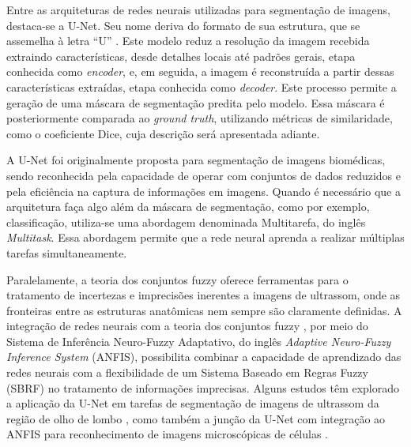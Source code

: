 Entre as arquiteturas de redes neurais utilizadas para segmentação de imagens, destaca-se a U-Net. Seu nome deriva do formato de sua estrutura, que se assemelha à letra “U” \cite{Ronneberger2015UNet}. Este modelo reduz a resolução da imagem recebida extraindo características, desde detalhes locais até padrões gerais, etapa conhecida como \textit{encoder}, e, em seguida, a imagem é reconstruída a partir dessas características extraídas, etapa conhecida como \textit{decoder}. Este processo permite a geração de uma máscara de segmentação predita pelo modelo. Essa máscara é posteriormente comparada ao \textit{ground truth}, utilizando métricas de similaridade, como o coeficiente Dice, cuja descrição será apresentada adiante.


A U-Net foi originalmente proposta para segmentação de imagens biomédicas, sendo reconhecida pela capacidade de operar com conjuntos de dados reduzidos e pela eficiência na captura de informações em imagens. Quando é necessário que a arquitetura faça algo além da máscara de segmentação, como por exemplo, classificação, utiliza-se uma abordagem denominada Multitarefa, do inglês \textit{Multitask}. Essa abordagem permite que a rede neural aprenda a realizar múltiplas tarefas simultaneamente. 

Paralelamente, a teoria dos conjuntos fuzzy \cite{zadeh1965fuzzy} oferece ferramentas para o tratamento de incertezas e imprecisões inerentes a imagens de ultrassom, onde as fronteiras entre as estruturas anatômicas nem sempre são claramente definidas. A integração de redes neurais com a teoria dos conjuntos fuzzy \cite{intro:unetfuzzy}, por meio do Sistema de Inferência Neuro-Fuzzy Adaptativo, do inglês \textit{Adaptive Neuro-Fuzzy Inference System} (ANFIS), possibilita combinar a capacidade de aprendizado das redes neurais com a flexibilidade de um Sistema Baseado em Regras Fuzzy (SBRF) no tratamento de informações imprecisas. Alguns estudos têm explorado a aplicação da U-Net em tarefas de segmentação de imagens de ultrassom da região de olho de lombo \cite{JadersonMelo2022UNetpp}, como também a junção da U-Net com integração ao ANFIS para reconhecimento de imagens microscópicas de células \cite{Kirichev_unetfuzzy}. 

